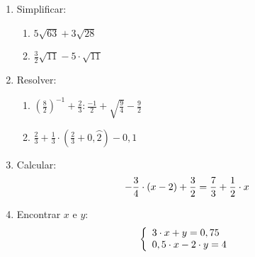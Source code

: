 \begin{enumerate}
\renewcommand{\labelenumi}{{\theenumi})}
\item Simplificar:
 \begin{enumerate}
    \item $5\sqrt{63}+3\sqrt{28}$
    \item $\frac{3}{2}\sqrt{11}-5\cdot \sqrt{11}$
   \end{enumerate}
\item Resolver:
    \begin{enumerate}
        \item $(\frac{8}{2})^{-1}+\frac{2}{3}:\frac{-1}{2}+\sqrt{\frac{9}{4}}-\frac{9}{2}$
        \item $\frac{2}{3}+\frac{1}{3}\cdot (\frac{2}{3}+0,\wideparen{2})-0,1$
     \end{enumerate}
\item Calcular:
    \begin{equation}
        \notag
        -\frac{3}{4}\cdot (x-2) +\frac{3}{2}=\frac{7}{3}+\frac{1}{2}\cdot x
    \end{equation}
\item Encontrar $x$ e $y$:
    \begin{equation}
    \notag
        \left\{ \begin{array}{lcc}
                 3\cdot x + y = 0,75
                 \\0,5\cdot x-2\cdot  y = 4
                 \end{array}
        \right.
    \end{equation}
\end{enumerate}
